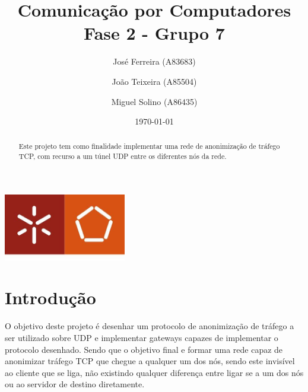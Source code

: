\documentclass[a4paper]{report}
\begin{document}
\title{Comunicação por Computadores\\ 
\large Fase 2 - Grupo 7}
\author{José Ferreira (A83683) \and João Teixeira (A85504) \and Miguel Solino (A86435)}
\date{\today}

\begin{center}
    \begin{minipage}{0.75\linewidth}
        \centering
        \includegraphics[width=0.4\textwidth]{images/eng.jpeg}\par\vspace{1cm}
        \vspace{1.5cm}
        \href{https://www.uminho.pt/PT}
        {\color{black}{\scshape\LARGE Universidade do Minho}} \par
        \vspace{1cm}
        \href{https://www.di.uminho.pt/}
        {\color{black}{\scshape\Large Departamento de Informática}} \par
        \vspace{1.5cm}
        \maketitle
    \end{minipage}
\end{center}

\pagebreak

\begin{abstract}
    \begin{center}
        Este projeto tem como finalidade implementar uma rede de anonimização de
        tráfego TCP, com recurso a um túnel UDP entre os diferentes nós da rede.
    \end{center}
\end{abstract}

\tableofcontents

\chapter{Introdução}

O objetivo deste projeto é desenhar um protocolo de anonimização de tráfego
a ser utilizado sobre UDP e implementar gateways capazes de implementar o 
protocolo desenhado. Sendo que o objetivo final e formar uma rede capaz de
anonimizar tráfego TCP que chegue a qualquer um dos nós, sendo este invisível ao
cliente que se liga, não existindo qualquer diferença entre ligar se a um dos
nós ou ao servidor de destino diretamente.
\end{document}
